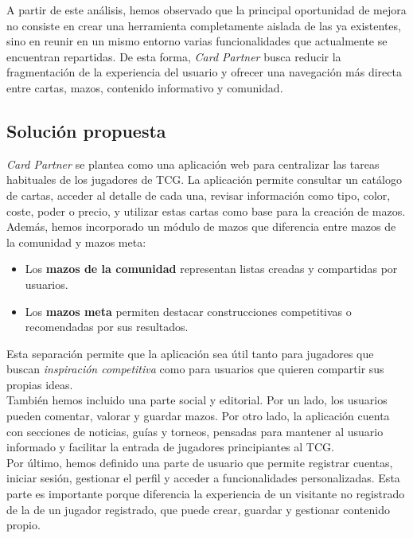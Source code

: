 \documentclass[10pt]{article}
\begin{document}
    \newpage
        
        A partir de este análisis, hemos observado que la principal oportunidad de mejora no consiste en crear una herramienta completamente aislada de las ya existentes, sino en reunir en un mismo entorno varias funcionalidades que actualmente se encuentran repartidas. De esta forma, \textit{Card Partner} busca reducir la fragmentación de la experiencia del usuario y ofrecer una navegación más directa entre cartas, mazos, contenido informativo y comunidad.
        
    \subsection{Solución propuesta}        
        \textit{Card Partner} se plantea como una aplicación web para centralizar las tareas habituales de los jugadores de TCG. La aplicación permite consultar un catálogo de cartas, acceder al detalle de cada una, revisar información como tipo, color, coste, poder o precio, y utilizar estas cartas como base para la creación de mazos. Además, hemos incorporado un módulo de mazos que diferencia entre mazos de la comunidad y mazos meta:
        
        \begin{itemize}
            \item Los \textbf{mazos de la comunidad} representan listas creadas y compartidas por usuarios.
            \item Los \textbf{mazos meta} permiten destacar construcciones competitivas o recomendadas por sus resultados.
        \end{itemize}
        
        Esta separación permite que la aplicación sea útil tanto para jugadores que buscan \textit{inspiración competitiva} como para usuarios que quieren compartir sus propias ideas.\\
        
        También hemos incluido una parte social y editorial. Por un lado, los usuarios pueden comentar, valorar y guardar mazos. Por otro lado, la aplicación cuenta con secciones de noticias, guías y torneos, pensadas para mantener al usuario informado y facilitar la entrada de jugadores principiantes al TCG.\\
        
        Por último, hemos definido una parte de usuario que permite registrar cuentas, iniciar sesión, gestionar el perfil y acceder a funcionalidades personalizadas. Esta parte es importante porque diferencia la experiencia de un visitante no registrado de la de un jugador registrado, que puede crear, guardar y gestionar contenido propio.
\end{document}
